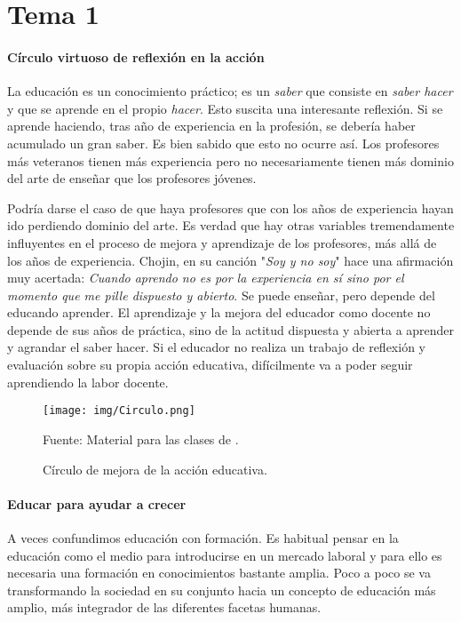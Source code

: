 \section{Tema 1}

\paragraph{Círculo virtuoso de reflexión en la acción}
La educación es un conocimiento práctico; es un \textit{saber} que consiste en \textit{saber hacer} y que se aprende en el propio \textit{hacer}.
%
Esto suscita una interesante reflexión.
%
Si se aprende haciendo, tras año de experiencia en la profesión, se debería haber acumulado un gran saber.
%
Es bien sabido que esto no ocurre así.
%
Los profesores más veteranos tienen más experiencia pero no necesariamente tienen más dominio del arte de enseñar que los profesores jóvenes. 

Podría darse el caso de que haya profesores que con los años de experiencia hayan ido perdiendo dominio del arte. 
%
Es verdad que hay otras variables tremendamente influyentes en el proceso de mejora y aprendizaje de los profesores, más allá de los años de experiencia.
%
Chojin, en su canción "\textit{Soy y no soy}" hace una afirmación muy acertada: \textit{Cuando aprendo no es por la experiencia en sí sino por el momento que me pille dispuesto y abierto}.
%
Se puede enseñar, pero depende del educando aprender.
%
El aprendizaje y la mejora del educador como docente no depende de sus años de práctica, sino de la actitud dispuesta y abierta a aprender y agrandar el saber hacer.
%
Si el educador no realiza un trabajo de reflexión y evaluación sobre su propia acción educativa, difícilmente va a poder seguir aprendiendo la labor docente.

\begin{figure}[hbt]
\centering
\texttt{[image: img/Circulo.png]}
\caption{Círculo de mejora de la acción educativa.}
\small{Fuente: Material para las clases de \profe.}
\label{Circulo}
\end{figure}

\paragraph{Educar para ayudar a crecer} A veces confundimos educación con formación. 
%
Es habitual pensar en la educación como el medio para introducirse en un mercado laboral y para ello es necesaria una formación en conocimientos bastante amplia.
%
Poco a poco se va transformando la sociedad en su conjunto hacia un concepto de educación más amplio, más integrador de las diferentes facetas humanas.

